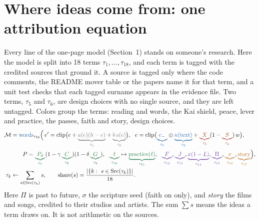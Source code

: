\documentclass[10pt]{article}
\theoremstyle{remark}
\begin{document}
\section{Where ideas come from: one attribution equation}\label{sec:sources}
Every line of the one-page model (Section~1) stands on someone's research. Here the model is split into 18 terms $\tau_1,\dots,\tau_{18}$, and each term is tagged with the credited sources that ground it. A source is tagged only where the code comments, the README mover table or the papers name it for that term, and a unit test checks that each tagged surname appears in the evidence file. Two terms, $\tau_5$ and $\tau_6$, are design choices with no single source, and they are left untagged. Colors group the terms: \textcolor{mfblue}{reading and words}, \textcolor{mfred}{the Kai shield}, \textcolor{mfgreen}{peace, lever and practice}, \textcolor{mfpurple}{the passes}, \textcolor{mforange}{faith and story}, \textcolor{mfgray}{design choices}.
{\small
\begin{align*}
\mathcal{M} &= \textcolor{mfblue}{\mathrm{words}}_{\tau_{18}}\Big(\, e'=\mathrm{clip}\big(e+\textcolor{mfgray}{\underbrace{a(e)(h-e)}_{\tau_5}}+\textcolor{mfgray}{\underbrace{b\,s(e)}_{\tau_6}}\big),\ \ e=\mathrm{clip}\big(\textcolor{mfblue}{\underbrace{e_-}_{\tau_1}}\oplus\textcolor{mfblue}{\underbrace{n(\text{text})}_{\tau_2}}+\textcolor{mfred}{\underbrace{X}_{\tau_3}}(1-\textcolor{mfred}{\underbrace{S}_{\tau_4}})\,w\big),\\
&\qquad P=\textcolor{mfgreen}{\underbrace{P_d}_{\tau_7}}(1-\gamma\,\textcolor{mfgreen}{\underbrace{C}_{\tau_8}})(1-\delta\,\textcolor{mfgreen}{\underbrace{G}_{\tau_9}}),\ \ \textcolor{mfgreen}{\underbrace{\ell}_{\tau_{10}}}\mapsto\textcolor{mfgreen}{\underbrace{\mathrm{practice}(\ell)}_{\tau_{11}}},\ \ \textcolor{mfpurple}{\underbrace{F}_{\tau_{12}}},\textcolor{mfpurple}{\underbrace{J}_{\tau_{13}}},\textcolor{mfpurple}{\underbrace{x(1-L)}_{\tau_{14}}},\textcolor{mfpurple}{\underbrace{\Pi}_{\tau_{15}}},\textcolor{mforange}{\underbrace{\sigma}_{\tau_{16}}},\textcolor{mforange}{\underbrace{\mathrm{story}}_{\tau_{17}}}\Big),\\
\tau_k &\leftarrow \sum_{s\in\mathrm{Src}(\tau_k)} s,\qquad \mathrm{share}(s)=\frac{\left|\{k:\ s\in\mathrm{Src}(\tau_k)\}\right|}{18}.
\end{align*}}
Here $\Pi$ is past to future, $\sigma$ the scripture seed (faith on only), and \emph{story} the films and songs, credited to their studios and artists. The sum $\sum s$ means the ideas a term draws on. It is not arithmetic on the sources.
\end{document}

